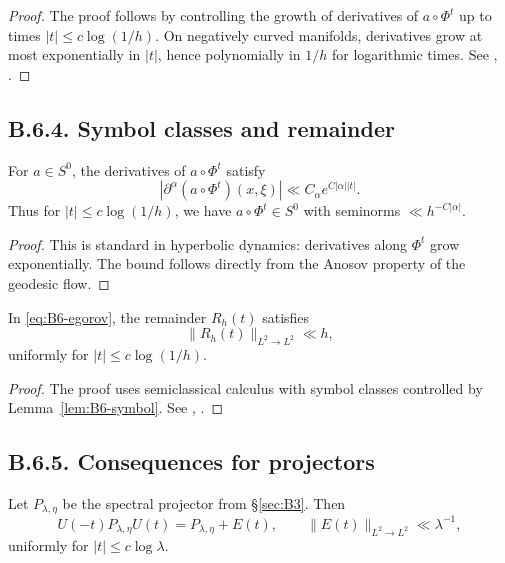 \begin{proof}
The proof follows by controlling the growth of derivatives of $a\circ \Phi^t$ up to times $|t|\le c\log(1/h)$.
On negatively curved manifolds, derivatives grow at most exponentially in $|t|$, hence polynomially in $1/h$ for logarithmic times.
See \cite[Thm.~11.12]{Zworski}, \cite{DyatlovZworski}.
\end{proof}

\subsection*{B.6.4. Symbol classes and remainder}

\begin{lemma}\label{lem:B6-symbol}
For $a\in S^0$, the derivatives of $a\circ \Phi^t$ satisfy
\[
|\partial^\alpha (a\circ \Phi^t)(x,\xi)|\ll C_\alpha e^{C|\alpha||t|}.
\]
Thus for $|t|\le c\log(1/h)$, we have $a\circ \Phi^t\in S^0$ with seminorms $\ll h^{-C|\alpha|}$.
\end{lemma}

\begin{proof}
This is standard in hyperbolic dynamics: derivatives along $\Phi^t$ grow exponentially.
The bound follows directly from the Anosov property of the geodesic flow.
\end{proof}

\begin{lemma}\label{lem:B6-rem}
In \eqref{eq:B6-egorov}, the remainder $R_h(t)$ satisfies
\[
\|R_h(t)\|_{L^2\to L^2}\ll h,
\]
uniformly for $|t|\le c\log(1/h)$.
\end{lemma}

\begin{proof}
The proof uses semiclassical calculus with symbol classes controlled by Lemma~\ref{lem:B6-symbol}.
See \cite{Zworski}, \cite{DyatlovZworski}.
\end{proof}

\subsection*{B.6.5. Consequences for projectors}

\begin{proposition}\label{prop:B6-proj}
Let $P_{\lambda,\eta}$ be the spectral projector from \S\ref{sec:B3}.
Then
\[
U(-t)P_{\lambda,\eta}U(t)=P_{\lambda,\eta}+E(t),
\qquad \|E(t)\|_{L^2\to L^2}\ll \lambda^{-1},
\]
uniformly for $|t|\le c\log \lambda$.
\end{proposition}

